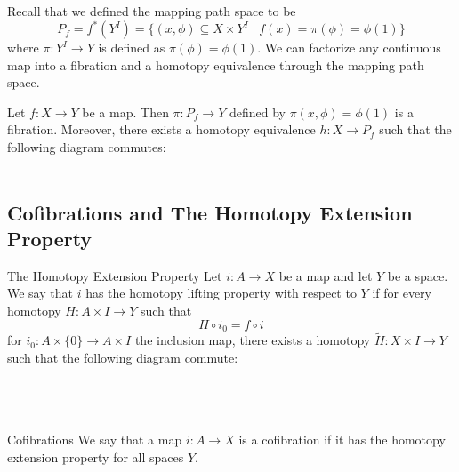 \documentclass[a4paper]{article}
\begin{document}
Recall that we defined the mapping path space to be $$P_f=f^\ast(Y^I)=\{(x,\phi)\subseteq X\times Y^I\;|\;f(x)=\pi(\phi)=\phi(1)\}$$ where $\pi:Y^I\to Y$ is defined as $\pi(\phi)=\phi(1)$. We can factorize any continuous map into a fibration and a homotopy equivalence through the mapping path space. 

\begin{thm}{}{} Let $f:X\to Y$ be a map. Then $\pi:P_f\to Y$ defined by $\pi(x,\phi)=\phi(1)$ is a fibration. Moreover, there exists a homotopy equivalence $h:X\to P_f$ such that the following diagram commutes: \\~\\
\end{thm}

\subsection{Cofibrations and The Homotopy Extension Property}
\begin{defn}{The Homotopy Extension Property}{} Let $i:A\to X$ be a map and let $Y$ be a space. We say that $i$ has the homotopy lifting property with respect to $Y$ if for every homotopy $H:A\times I\to Y$ such that $$H\circ i_0=f\circ i$$ for $i_0:A\times\{0\}\to A\times I$ the inclusion map, there exists a homotopy $\widetilde{H}:X\times I\to Y$ such that the following diagram commute: \\~\\
\\~\\
\end{defn}

\begin{defn}{Cofibrations}{} We say that a map $i:A\to X$ is a cofibration if it has the homotopy extension property for all spaces $Y$. 
\end{defn}
\end{document}
